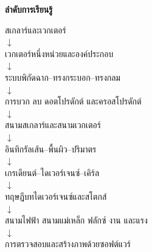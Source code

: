 \textbf{ลำดับการเรียนรู้}
\begin{center}
สเกลาร์และเวกเตอร์\\
\(\downarrow\)\\
เวกเตอร์หนึ่งหน่วยและองค์ประกอบ\\
\(\downarrow\)\\
ระบบพิกัดฉาก--ทรงกระบอก--ทรงกลม\\
\(\downarrow\)\\
การบวก ลบ ดอตโปรดักต์ และครอสโปรดักต์\\
\(\downarrow\)\\
สนามสเกลาร์และสนามเวกเตอร์\\
\(\downarrow\)\\
อินทิกรัลเส้น--พื้นผิว--ปริมาตร\\
\(\downarrow\)\\
เกรเดียนต์--ไดเวอร์เจนซ์--เคิร์ล\\
\(\downarrow\)\\
ทฤษฎีบทไดเวอร์เจนซ์และสโตกส์\\
\(\downarrow\)\\
สนามไฟฟ้า สนามแม่เหล็ก ฟลักซ์ งาน และแรง\\
\(\downarrow\)\\
การตรวจสอบและสร้างภาพด้วยซอฟต์แวร์
\end{center}


